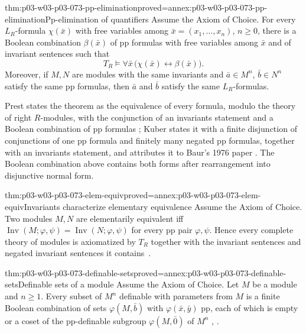 \begin{hbtheorem}{thm:p03-w03-p03-073-pp-elimination}{proved=annex:p03-w03-p03-073-pp-elimination}{Pp-elimination of quantifiers}
Assume the Axiom of Choice. For every \(L_R\)-formula
\(\chi(\bar x)\) with free variables among \(\bar x=(x_1,\ldots,x_n)\),
\(n\ge0\), there is a Boolean combination \(\beta(\bar x)\) of pp formulas
with free variables among \(\bar x\) and of invariant sentences such that
\[
 T_R\models\forall\bar x\,\bigl(\chi(\bar x)\leftrightarrow\beta(\bar x)\bigr).
\]
Moreover, if \(M,N\) are modules with the same invariants and
\(\bar a\in M^n\), \(\bar b\in N^n\) satisfy the same pp formulas, then
\(\bar a\) and \(\bar b\) satisfy the same \(L_R\)-formulas.
\end{hbtheorem}

Prest states the theorem as the equivalence of every formula, modulo the
theory of right \(R\)-modules, with the conjunction of an invariants
statement and a Boolean combination of pp formulas
\cite[Theorem~4.1]{Prest2020ModelTheoryModules}; Kuber states it with a
finite disjunction of conjunctions of one pp formula and finitely many
negated pp formulas, together with an invariants statement, and attributes
it to Baur's 1976 paper
\cite[Theorem~2.5.5]{Kuber2013GrothendieckModules}. The Boolean combination
above contains both forms after rearrangement into disjunctive normal form.

\begin{hbcorollary}{thm:p03-w03-p03-073-elem-equiv}{proved=annex:p03-w03-p03-073-elem-equiv}{Invariants characterize elementary equivalence}
Assume the Axiom of Choice. Two modules \(M,N\) are elementarily
equivalent iff \(\operatorname{Inv}(M;\varphi,\psi)=\operatorname{Inv}(N;\varphi,\psi)\)
for every pp pair \(\varphi,\psi\). Hence every complete theory of
modules is axiomatized by \(T_R\) together with the invariant sentences
and negated invariant sentences it contains~\cite[\S7]{Prest2020ModelTheoryModules}.
\end{hbcorollary}

\begin{hbcorollary}{thm:p03-w03-p03-073-definable-sets}{proved=annex:p03-w03-p03-073-definable-sets}{Definable sets of a module}
Assume the Axiom of Choice. Let \(M\) be a module and \(n\ge1\). Every
subset of \(M^n\) definable with parameters from \(M\) is a finite Boolean
combination of sets \(\varphi(M,\bar b)\) with \(\varphi(\bar x,\bar y)\)
pp, each of which is empty or a coset of the pp-definable subgroup
\(\varphi(M,\bar 0)\) of \(M^n\)
\cite[after Theorem~4.1]{Prest2020ModelTheoryModules},
\cite[Theorem~2.5.6]{Kuber2013GrothendieckModules}.
\end{hbcorollary}

